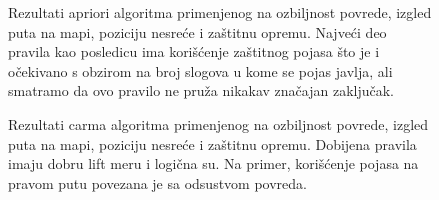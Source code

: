 \documentclass[a4paper,10pt]{article}
\begin{document}
\begin{figure}[h!]
 \centering
 \caption{Rezultati apriori algoritma primenjenog na ozbiljnost povrede, izgled puta na mapi, poziciju nesreće i zaštitnu opremu. 
 Najveći deo pravila kao posledicu ima korišćenje zaštitnog pojasa što je i očekivano s obzirom na broj slogova u kome se pojas 
 javlja, ali smatramo da ovo pravilo ne pruža nikakav značajan zaključak.}
\end{figure}

\begin{figure}[h!]
 \centering
 \caption{Rezultati carma algoritma primenjenog na ozbiljnost povrede, izgled puta na mapi, poziciju nesreće i zaštitnu opremu. 
 Dobijena pravila imaju dobru lift meru i logična su. Na primer, korišćenje pojasa na pravom putu povezana je sa odsustvom povreda.  }
\end{figure}
\end{document}
